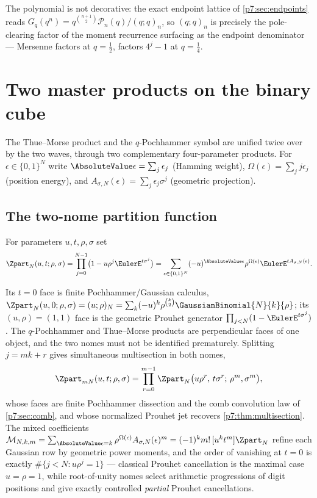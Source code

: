 \documentclass[11pt,oneside]{article}
\numberwithin{equation}{section}
\theoremstyle{definition}
\theoremstyle{remark}
\begin{document}
The polynomial is not decorative: the exact endpoint lattice of
\cref{p7:sec:endpoints} reads
$G_q(q^n)=q^{\binom{n+1}2}\mathcal P_n(q)/(q;q)_n$, so $(q;q)_n$ is precisely
the pole-clearing factor of the moment recurrence surfacing as the endpoint
denominator --- Mersenne factors at $q=\tfrac12$, factors $4^j-1$ at
$q=\tfrac14$.
\section{Two master products on the binary cube}
\label{p7:sec:master-products}

The Thue--Morse product and the $q$-Pochhammer symbol are unified twice over
by the two waves, through two complementary four-parameter products.  For
$\epsilon\in\{0,1\}^N$ write
$\AbsoluteValue\epsilon=\sum_j\epsilon_j$ (Hamming weight),
$\Omega(\epsilon)=\sum_jj\epsilon_j$ (position energy), and
$A_{\sigma,N}(\epsilon)=\sum_j\epsilon_j\sigma^j$ (geometric projection).

\subsection{The two-nome partition function}

\begin{definition}
\label{p7:def:two-nome}
For parameters $u,t,\rho,\sigma$ set
\begin{equation}\label{p7:eq:Z-master}
 \Zpart_N(u,t;\rho,\sigma)=
 \prod_{j=0}^{N-1}\bigl(1-u\rho^j\EulerE^{t\sigma^j}\bigr)
 =\sum_{\epsilon\in\{0,1\}^N}
 (-u)^{\AbsoluteValue\epsilon}\rho^{\Omega(\epsilon)}
 \EulerE^{tA_{\sigma,N}(\epsilon)}.
\end{equation}
\end{definition}

Its $t=0$ face is finite Pochhammer/Gaussian calculus,
$\Zpart_N(u,0;\rho,\sigma)=(u;\rho)_N
=\sum_k(-u)^k\rho^{\binom k2}\GaussianBinomial{N}{k}{\rho}$; its $(u,\rho)=(1,1)$ face is
the geometric Prouhet generator
$\prod_{j<N}(1-\EulerE^{t\sigma^j})$.  The $q$-Pochhammer and Thue--Morse products
are perpendicular faces of one object, and the two nomes must not be
identified prematurely.  Splitting $j=mk+r$ gives simultaneous multisection in
both nomes,
\begin{equation}\label{p7:eq:Z-multisection}
 \Zpart_{mN}(u,t;\rho,\sigma)
 =\prod_{r=0}^{m-1}
 \Zpart_N\bigl(u\rho^r,\,t\sigma^r;\,\rho^m,\sigma^m\bigr),
\end{equation}
whose faces are finite Pochhammer dissection and the comb convolution law of
\cref{p7:sec:comb}, and whose normalized Prouhet jet recovers
\cref{p7:thm:multisection}.  The mixed coefficients
$\mathcal M_{N,k,m}=\sum_{\AbsoluteValue\epsilon=k}\rho^{\Omega(\epsilon)}
A_{\sigma,N}(\epsilon)^m=(-1)^km!\,[u^kt^m]\Zpart_N$ refine each Gaussian row
by geometric power moments, and the order of vanishing at $t=0$ is exactly
$\#\{j<N:u\rho^j=1\}$ --- classical Prouhet cancellation is the maximal case
$u=\rho=1$, while root-of-unity nomes select arithmetic progressions of digit
positions and give exactly controlled \emph{partial} Prouhet cancellations.
\end{document}

